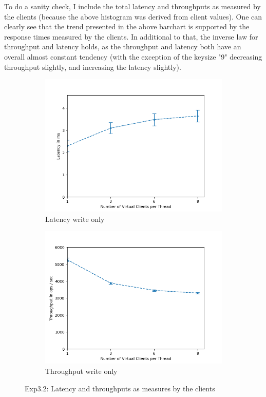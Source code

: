 \documentclass[11pt,a4paper]{article}
\begin{document}
To do a sanity check, I include the total latency and throughputs as measured by the clients (because the above histogram was derived from client values).
One can clearly see that the trend presented in the above barchart is supported by the response times measured by the clients.
In additional to that, the inverse law for throughput and latency holds, as the throughput and latency both have an overall almost constant tendency (with the exception of the keysize "9" decreasing throughput slightly, and increasing the latency slightly).

\begin{figure}[H]
\centering
\begin{subfigure}{.5\textwidth}
    \centering
    \includegraphics[width=\textwidth]{img/exp5_1/exp5_1__client_latency_sharding_True.png}
    \caption{Latency write only}
    \label{fig:mesh1}
\end{subfigure}%
\begin{subfigure}{.5\textwidth}
      \centering
    \includegraphics[width=\textwidth]{img/exp5_1/exp5_1__client_throughput_sharding_True.png}
    \caption{Throughput write only}
    \label{fig:mesh1}
\end{subfigure}
\caption{Exp3.2: Latency and throughputs as measures by the clients}
\label{fig:test}
\end{figure}
\end{document}
